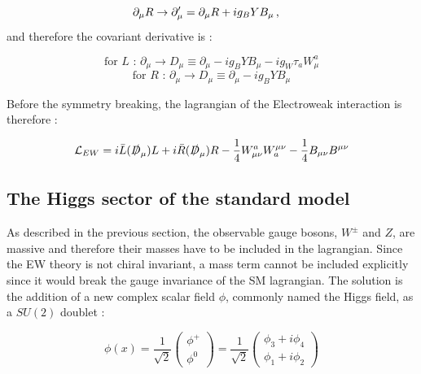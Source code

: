 \begin{equation}
    \partial_{\mu}R \rightarrow \partial_{\mu}' = \partial_{\mu}R + ig_B Y B_{\mu} \msep
\end{equation}
and therefore the covariant derivative is :

\begin{equation}
    \text{for $L$ :       } \partial_{\mu} \rightarrow D_{\mu} \equiv \partial_{\mu} - ig_B Y B_{\mu} - ig_W \tau_a W_{\mu}^a
\end{equation}
\begin{equation}
    \text{for $R$ :       } \partial_{\mu} \rightarrow D_{\mu} \equiv \partial_{\mu} - ig_B Y B_{\mu}
\end{equation}

Before the symmetry breaking, the lagrangian of the Electroweak interaction is therefore :

\begin{equation}
    \mathcal{L}_{EW} = i\Bar{L}(\slashed{D}_{\mu})L + i\Bar{R}(\slashed{D}_{\mu})R -\frac{1}{4}W_{\mu\nu}^a W^{\mu\nu}_a - \frac{1}{4}B_{\mu\nu}B^{\mu\nu}
\end{equation}

\subsection{The Higgs sector of the standard model}
\label{sec:SM_higgs}

As described in the previous section, the observable gauge bosons, $W^{\pm}$ and $Z$, are massive and therefore their masses have to be included in the lagrangian. Since the EW theory is not chiral invariant, a mass term cannot be included explicitly since it would break the gauge invariance of the SM lagrangian. The solution \cite{PhysRevLett.13.508} is the addition of a new complex scalar field $\phi$, commonly named the Higgs field, as a $SU(2)$ doublet :

\begin{equation}
    \phi(x) = \frac{1}{\sqrt{2}} \begin{pmatrix} \phi^+ \\ \phi^0 \end{pmatrix} = \frac{1}{\sqrt{2}} \begin{pmatrix} \phi_3 + i \phi_4 \\ \phi_1 + i \phi_2 \end{pmatrix}
\end{equation}

